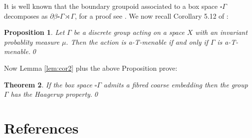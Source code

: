 \documentclass[preprint]{elsarticle}
\theoremstyle{plain}
\newtheorem{theorem}{Theorem}%
\newtheorem{proposition}[theorem]{Proposition}%
\theoremstyle{definition}%
\theoremstyle{remark}%
\begin{document}
It is well known that the boundary groupoid associated to a box space $\square\Gamma$ decomposes as $\partial\beta \square \Gamma \rtimes \Gamma$, for a proof see \cite{mypub1}. We now recall Corollary 5.12 of \cite{BG-action-2012}:

\begin{proposition}\label{prop:cor}
Let $\Gamma$ be a discrete group acting on a space $X$ with an invariant probablity measure $\mu$. Then the action is a-T-menable if and only if $\Gamma$ is a-T-menable.\qed
\end{proposition}

Now Lemma \ref{lem:cor2} plus the above Proposition prove:

\begin{theorem}\label{thm:cor2}
If the box space $\square \Gamma$ admits a fibred coarse embedding then the group $\Gamma$ has the Haagerup property.\qed
\end{theorem}

\section*{References}


\end{document}
